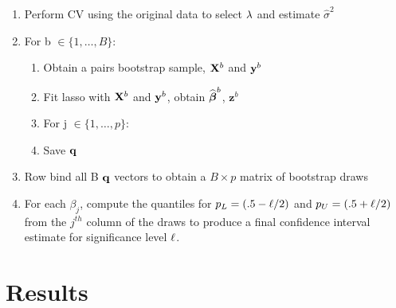 \begin{enumerate}
\item Perform CV using the original data to select $\lambda$ and estimate $\hat{\sigma}^2$
\item For b $\in \lbrace 1, \ldots, B \rbrace$:
\begin{enumerate}
\item Obtain a pairs bootstrap sample, $\mathbf{X}^b$ and $\mathbf{y}^b$
\item Fit lasso with $\mathbf{X}^b$ and $\mathbf{y}^b$, obtain $\widehat{\boldsymbol{\beta}}^b$, $\boldsymbol{z}^b$
\item For j $\in \lbrace 1, \ldots, p \rbrace$:
	\begin{algorithmic}
    \EndCase
    \EndCase
    \EndCase
    \EndCase
	\EndSwitch 
	\end{algorithmic}
\item Save $\mathbf{q}$
\end{enumerate}
\item Row bind all B $\mathbf{q}$ vectors to obtain a $B \times p$ matrix of bootstrap draws
\item For each $\beta_j$, compute the quantiles for $p_L = (.5 - \ell/2)$ and $p_U = (.5 + \ell/2)$ from the $j^{th}$ column of the draws to produce a final confidence interval estimate for significance level $\ell$.
\end{enumerate}

\section{Results}

